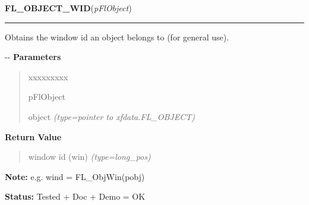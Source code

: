 \hspace{.8\funcindent}\begin{boxedminipage}{\funcwidth}

    \raggedright \textbf{FL\_OBJECT\_WID}(\textit{pFlObject})

    \vspace{-1.5ex}

    \rule{\textwidth}{0.5\fboxrule}
\setlength{\parskip}{2ex}

Obtains the window id an object belongs to (for general use).

-{}-
\setlength{\parskip}{1ex}
      \textbf{Parameters}
      \vspace{-1ex}

      \begin{quote}
        \begin{Ventry}{xxxxxxxxx}

          \item[pFlObject]


object
            {\it (type=pointer to xfdata.FL\_OBJECT)}

        \end{Ventry}

      \end{quote}

      \textbf{Return Value}
    \vspace{-1ex}

      \begin{quote}

window id (win)
      {\it (type=long\_pos)}

      \end{quote}

\textbf{Note:} 
e.g. wind = FL\_ObjWin(pobj)


\textbf{Status:} 
Tested + Doc + Demo = OK


    \end{boxedminipage}

    \label{xformslib:flxbasic:fl_XNextEvent}

    \vspace{0.5ex}

